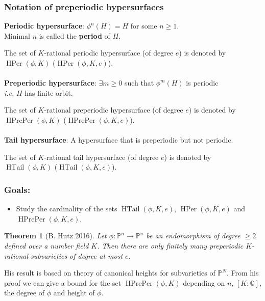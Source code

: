 \documentclass{beamer}
\def\PP{{\mathbb P}}
\def\QQ{{\mathbb Q}}
\DeclareMathOperator{\HTail}{HTail}
\DeclareMathOperator{\HPer}{HPer}
\DeclareMathOperator{\HPrePer}{HPrePer}
\theoremstyle{thmstyle}
\theoremstyle{thmstyle}
\newtheorem*{mythm}{Theorem}
\theoremstyle{mystyle}
\theoremstyle{qstnstyle}
\begin{document}
\begin{frame}
\frametitle{Notation of preperiodic hypersurfaces}

\textbf{Periodic hypersurface}: $\phi^n(H)=H$ for some $n\geq{1}$.
\\\quad\quad  Minimal $n$ is called the \textbf{period} of $H$.


\vspace{2mm}
The set of $K$-rational periodic hypersurface (of degree $e$) is denoted by $\HPer(\phi,K)$ ($\HPer(\phi,K,e)$).
\\\quad\\

\textbf{Preperiodic hypersurface}: $\exists m\geq{0}$ such that $\phi^m(H)$
is periodic \\\quad\quad  \emph{i.e.}  $H$ has finite orbit.


\vspace{2mm}
The set of $K$-rational preperiodic hypersurface (of degree $e$) is denoted by $\HPrePer(\phi,K)$ ($\HPrePer(\phi,K,e)$).
\\\quad\\

\textbf{Tail hypersurface}: A hypersurface that is preperiodic but not periodic.


\vspace{2mm}
The set of $K$-rational tail hypersurface (of degree $e$) is denoted by $\HTail(\phi,K)$ ($\HTail(\phi,K,e)$).
\end{frame}

\begin{frame}
\frametitle{Goals:}
\begin{itemize}
\pause
\item Study the cardinality of the sets $\HTail(\phi,K,e)$, $\HPer(\phi,K,e)$ and $\HPrePer(\phi,K,e)$. 
\end{itemize}
\pause

\vspace{8mm}

\begin{mythm}[B. Hutz 2016]
Let $\phi : \PP^n \to \PP^n$ be an endomorphism of degree $\geq{2}$ defined over a number field $K$. Then there are only finitely many preperiodic $K$-rational subvarieties of degree at most $e$.
\end{mythm}

\pause
His result is based on theory of canonical heights for subvarieties of $\PP^N$. From his proof we can give a bound for the set $\HPrePer(\phi,K)$ depending on $n$, $[K:\QQ]$, the degree of $\phi$ and height of $\phi$.

\end{frame}
\end{document}
